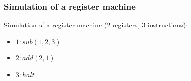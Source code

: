     \begin{frame}[t]\frametitle{Simulation of a register machine}
      Simulation of a register machine (2 registers, 3 instructions):
      \begin{itemize}
        \item $1: sub(1,2,3)$
        \item $2: add(2,1)$
        \item $3: halt$
      \end{itemize}
    \end{frame}
    \note{}

